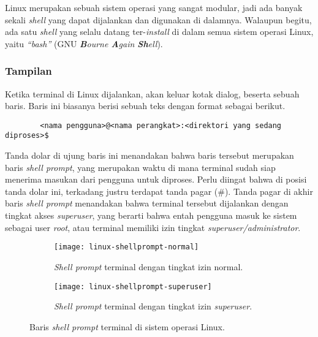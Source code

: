 Linux merupakan sebuah sistem operasi yang sangat modular, jadi ada banyak sekali \textit{shell} yang dapat dijalankan dan digunakan di dalamnya. Walaupun begitu, ada satu \textit{shell} yang selalu datang ter-\textit{install} di dalam semua sistem operasi Linux, yaitu \textit{``bash''} (GNU \textit{\textbf{B}ourne \textbf{A}gain \textbf{Sh}ell}).\cite{matthew:2007:beginninglinuxprogramming}

\subsubsection{Tampilan}
\label{sec:commandline-linux-appearance}

Ketika terminal di Linux dijalankan, akan keluar kotak dialog, beserta sebuah baris. Baris ini biasanya berisi sebuah teks dengan format sebagai berikut.

\begin{verbatim}
        <nama pengguna>@<nama perangkat>:<direktori yang sedang diproses>$
\end{verbatim}

Tanda dolar di ujung baris ini menandakan bahwa baris tersebut merupakan baris \textit{shell prompt}, yang merupakan waktu di mana terminal sudah siap menerima masukan dari pengguna untuk diproses. Perlu diingat bahwa di posisi tanda dolar ini, terkadang justru terdapat tanda pagar (\#). Tanda pagar di akhir baris \textit{shell prompt} menandakan bahwa terminal tersebut dijalankan dengan tingkat akses \textit{superuser}, yang berarti bahwa entah pengguna masuk ke sistem sebagai user \textit{root}, atau terminal memiliki izin tingkat \textit{superuser/administrator}.\cite{shottsjr:2019:linuxcommandline}

\begin{figure}[ht]
    \begin{subfigure}[b]{0.475\linewidth}
		\centering
		\texttt{[image: linux-shellprompt-normal]}
		\caption{\textit{Shell prompt} terminal dengan tingkat izin \mbox{normal}.}
		\label{fig:shellprompt-linux-normal}
	\end{subfigure}
	\hfill
    \begin{subfigure}[b]{0.475\linewidth}
		\centering
		\texttt{[image: linux-shellprompt-superuser]}
		\caption{\textit{Shell prompt} terminal dengan tingkat izin \textit{\mbox{superuser}}.}
		\label{fig:shellprompt-linux-superuser}
	\end{subfigure}
    \caption{Baris \textit{shell prompt} terminal di sistem operasi Linux.}
	\label{fig:commandline-shellprompt-linux}
\end{figure}

